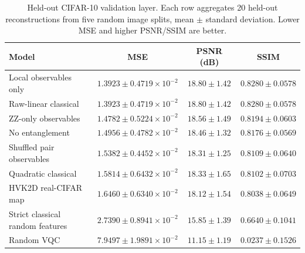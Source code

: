 \documentclass[journal]{IEEEtran}
\begin{document}
\begin{table}[t]
\centering
\caption{Held-out CIFAR-10 validation layer. Each row aggregates 20 held-out reconstructions from five random image splits, mean $\pm$ standard deviation. Lower MSE and higher PSNR/SSIM are better.}
\label{tab:hvk_real_cifar}
\scriptsize
\begin{tabular}{lccc}
\toprule
Model & MSE & PSNR (dB) & SSIM \\
\midrule
Local observables only & $1.3923{\pm}0.4719\times10^{-2}$ & $18.80{\pm}1.42$ & $0.8280{\pm}0.0578$ \\
Raw-linear classical & $1.3923{\pm}0.4719\times10^{-2}$ & $18.80{\pm}1.42$ & $0.8280{\pm}0.0578$ \\
ZZ-only observables & $1.4782{\pm}0.5224\times10^{-2}$ & $18.56{\pm}1.49$ & $0.8194{\pm}0.0603$ \\
No entanglement & $1.4956{\pm}0.4782\times10^{-2}$ & $18.46{\pm}1.32$ & $0.8176{\pm}0.0569$ \\
Shuffled pair observables & $1.5382{\pm}0.4452\times10^{-2}$ & $18.31{\pm}1.25$ & $0.8109{\pm}0.0640$ \\
Quadratic classical & $1.5814{\pm}0.6432\times10^{-2}$ & $18.33{\pm}1.65$ & $0.8102{\pm}0.0703$ \\
HVK2D real-CIFAR map & $1.6460{\pm}0.6340\times10^{-2}$ & $18.12{\pm}1.54$ & $0.8038{\pm}0.0649$ \\
Strict classical random features & $2.7390{\pm}0.8941\times10^{-2}$ & $15.85{\pm}1.39$ & $0.6640{\pm}0.1041$ \\
Random VQC & $7.9497{\pm}1.9891\times10^{-2}$ & $11.15{\pm}1.19$ & $0.0237{\pm}0.1526$ \\
\bottomrule
\end{tabular}
\end{table}
\end{document}
